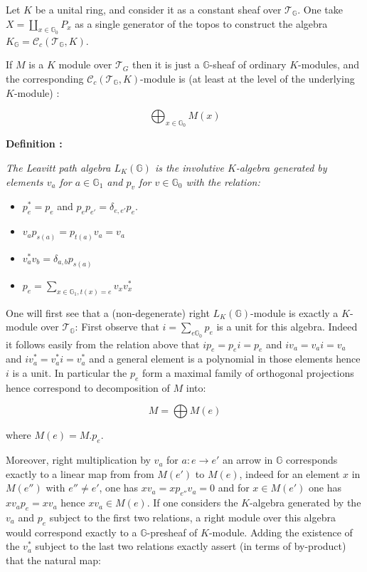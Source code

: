 \documentclass[a4paper]{article}
\newcommand{\G}{\mathbb{G}}
\newcommand{\Tcal}{\mathcal{T}}
\newcommand{\Ccal}{\mathcal{C}}
\newcommand{\Def}[1]
	{
	
	\bigskip
	
	\textbf{Definition : }{\itshape #1}
	
	\bigskip
	
	}
\begin{document}
{\bigskip

Let $K$ be a unital ring, and consider it as a constant sheaf over $\Tcal_{\G}$. One take $X= \coprod_{x \in \G_0} P_x$ as a single generator of the topos to construct the algebra $K_{\G} = \Ccal_c(\Tcal_{\G},K)$.

If $M$ is a $K$ module over $\Tcal_{G}$ then it is just a $\G$-sheaf of ordinary $K$-modules, and the corresponding $\Ccal_c(\Tcal_{\G},K)$-module is (at least at the level of the underlying $K$-module) :

\[ \bigoplus_{x \in \G_0} M(x) \]

\bigskip

\Def{The Leavitt path algebra $L_K(\G)$ is the involutive $K$-algebra generated by elements $v_a$ for $a \in \G_1$ and $p_v$ for $v \in \G_0$ with the relation:

\begin{itemize}

\item $p_e^*=p_e$ and $p_e p_{e'} = \delta_{e,e'} p_e$.

\item $v_a p_{s(a)} =p_{t(a)} v_a = v_a$

\item $v_a^* v_b = \delta_{a,b} p_{s(a)}$

\item $ p_e = \sum_{x \in \G_1, t(x)=e} v_x v_x^* $

\end{itemize}

}



One will first see that a (non-degenerate) right $L_K(\G)$-module is exactly a $K$-module over $\Tcal_{\G}$: First observe that $i=\sum_{e \G_0} p_e$ is a unit for this algebra. Indeed it follows easily from the relation above that $ip_e=p_e i = p_e$ and $i v_a = v_a i =v_a$ and $iv_a^* = v_a^* i = v_a^*$ and a general element is a polynomial in those elements hence $i$ is a unit. In particular the $p_e$ form a maximal family of orthogonal projections hence correspond to decomposition of $M$ into:

\[ M = \bigoplus M(e) \]

where $M(e) = M.p_e$.


Moreover, right multiplication by $v_a$ for $a:e \rightarrow e'$ an arrow in $\G$ corresponds exactly to a linear map from from $M(e')$ to $M(e)$, indeed for an element $x$ in $M(e'')$ with $e'' \neq e'$, one has $x v_a= x p_{e''} v_a = 0$ and for $x \in M(e')$ one has $x v_a p_e = x v_a$ hence $x v_a \in M(e)$. If one considers the $K$-algebra generated by the $v_a$ and $p_e$ subject to the first two relations, a right module over this algebra would correspond exactly to a $\G$-presheaf of $K$-module. Adding the existence of the $v_a^*$ subject to the last two relations exactly assert (in terms of by-product) that the natural map:

}
\end{document}
